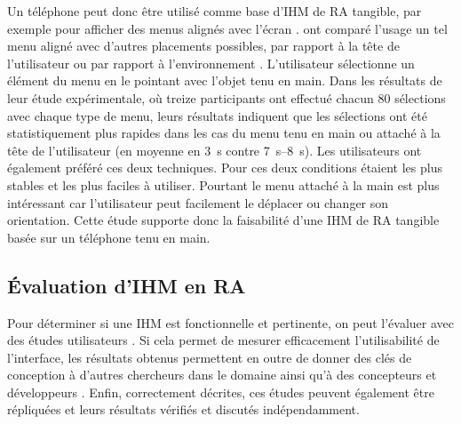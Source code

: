 
Un téléphone peut donc être utilisé comme base d'IHM de RA tangible, par exemple pour afficher des menus alignés avec l'écran . \cite{White2009} ont comparé l'usage un tel menu aligné avec d'autres placements possibles, par rapport à la tête de l'utilisateur ou par rapport à l'environnement . L'utilisateur sélectionne un élément du menu en le pointant avec l'objet tenu en main. Dans les résultats de leur étude expérimentale, où treize participants ont effectué chacun 80 sélections avec chaque type de menu, leurs résultats indiquent que les sélections ont été statistiquement plus rapides dans les cas du menu tenu en main ou attaché à la tête de l'utilisateur (en moyenne en \SI{3}{\s} contre \SIrange{7}{8}{\s}). Les utilisateurs ont également préféré ces deux techniques. Pour \citeauthor{White2009} ces deux conditions étaient les plus stables et les plus faciles à utiliser. Pourtant le menu attaché à la main est plus intéressant car l'utilisateur peut facilement le déplacer ou changer son orientation. Cette étude supporte donc la faisabilité d'une IHM de RA tangible basée sur un téléphone tenu en main.

\subsection{Évaluation d'IHM en RA}
\label{subsec:litterature_ar_hci_evaluation}

Pour déterminer si une IHM est fonctionnelle et pertinente, on peut l'évaluer avec des études utilisateurs \citep[p. 189]{Billinghurst2015}. Si cela permet de mesurer efficacement l'utilisabilité de l'interface, les résultats obtenus permettent en outre de donner des clés de conception à d'autres chercheurs dans le domaine ainsi qu'à des concepteurs et développeurs \citep[p. 20]{Jankowski2015}. Enfin, correctement décrites, ces études peuvent également être répliquées et leurs résultats vérifiés et discutés indépendamment.

